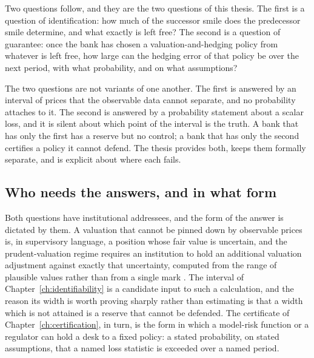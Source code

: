 \documentclass[../../../main.tex]{subfiles}
\begin{document}

Two questions follow, and they are the two questions of this thesis. The first is a question of identification: how much of the successor smile does the predecessor smile determine, and what exactly is left free? The second is a question of guarantee: once the bank has chosen a valuation-and-hedging policy from whatever is left free, how large can the hedging error of that policy be over the next period, with what probability, and on what assumptions?

The two questions are not variants of one another. The first is answered by an interval of prices that the observable data cannot separate, and no probability attaches to it. The second is answered by a probability statement about a scalar loss, and it is silent about which point of the interval is the truth. A bank that has only the first has a reserve but no control; a bank that has only the second certifies a policy it cannot defend. The thesis provides both, keeps them formally separate, and is explicit about where each fails.

\subsection{Who needs the answers, and in what form}

Both questions have institutional addressees, and the form of the answer is dictated by them. A valuation that cannot be pinned down by observable prices is, in supervisory language, a position whose fair value is uncertain, and the prudent-valuation regime requires an institution to hold an additional valuation adjustment against exactly that uncertainty, computed from the range of plausible values rather than from a single mark \citep{bcbs2019}. The interval of Chapter~\ref{ch:identifiability} is a candidate input to such a calculation, and the reason its width is worth proving sharply rather than estimating is that a width which is not attained is a reserve that cannot be defended. The certificate of Chapter~\ref{ch:certification}, in turn, is the form in which a model-risk function or a regulator can hold a desk to a fixed policy: a stated probability, on stated assumptions, that a named loss statistic is exceeded over a named period.
\end{document}
